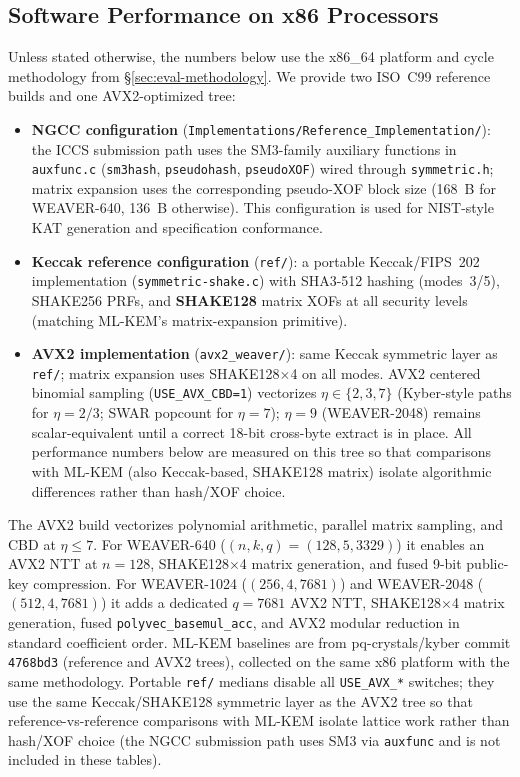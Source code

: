 \subsection{Software Performance on x86 Processors}
\label{sec:x86-perf}

Unless stated otherwise, the numbers below use the x86\_64 platform and cycle
methodology from \S\ref{sec:eval-methodology}.
We provide two ISO~C99 reference builds and one AVX2-optimized tree:
\begin{itemize}
  \item \textbf{NGCC configuration} (\texttt{Implementations/Reference\_Implementation/}):
        the ICCS submission path uses the SM3-family auxiliary functions in
        \texttt{auxfunc.c} (\texttt{sm3hash}, \texttt{pseudohash}, \texttt{pseudoXOF})
        wired through \texttt{symmetric.h}; matrix expansion uses the corresponding
        pseudo-XOF block size (168~B for \textsc{WEAVER-640}, 136~B otherwise).
        This configuration is used for NIST-style KAT generation and specification
        conformance.
  \item \textbf{Keccak reference configuration} (\texttt{ref/}): a portable Keccak/FIPS~202
        implementation (\texttt{symmetric-shake.c}) with SHA3-512 hashing (modes~3/5),
        SHAKE256 PRFs, and \textbf{SHAKE128} matrix XOFs at all security levels (matching
        ML-KEM's matrix-expansion primitive).
  \item \textbf{AVX2 implementation} (\texttt{avx2\_weaver/}): same Keccak symmetric layer
        as \texttt{ref/}; matrix expansion uses SHAKE128$\times$4 on all modes.
        AVX2 centered binomial sampling (\texttt{USE\_AVX\_CBD=1}) vectorizes
        $\eta\in\{2,3,7\}$ (Kyber-style paths for $\eta{=}2/3$; SWAR popcount for
        $\eta{=}7$); $\eta{=}9$ (\textsc{WEAVER-2048}) remains scalar-equivalent until a
        correct 18-bit cross-byte extract is in place.
        All performance numbers below are measured on this tree so that comparisons with
        ML-KEM (also Keccak-based, SHAKE128 matrix) isolate algorithmic differences rather
        than hash/XOF choice.
\end{itemize}

The AVX2 build vectorizes polynomial arithmetic, parallel matrix sampling, and
CBD at $\eta\le 7$.
For \textsc{WEAVER-640} ($(n,k,q){=}(128,5,3329)$) it enables an AVX2 NTT at
$n{=}128$, SHAKE128$\times$4 matrix generation, and fused 9-bit public-key
compression.
For \textsc{WEAVER-1024} ($(256,4,7681)$) and \textsc{WEAVER-2048}
($(512,4,7681)$) it adds a dedicated $q{=}7681$ AVX2 NTT, SHAKE128$\times$4
matrix generation, fused \texttt{polyvec\_basemul\_acc}, and AVX2 modular
reduction in standard coefficient order.
ML-KEM baselines are from pq-crystals/kyber commit \texttt{4768bd3} (reference
and AVX2 trees), collected on the same x86 platform with the same methodology.
Portable \texttt{ref/} medians disable all \texttt{USE\_AVX\_*} switches; they
use the same Keccak/SHAKE128 symmetric layer as the AVX2 tree so that
reference-vs-reference comparisons with ML-KEM isolate lattice work rather than
hash/XOF choice (the NGCC submission path uses SM3 via \texttt{auxfunc} and is
not included in these tables).

